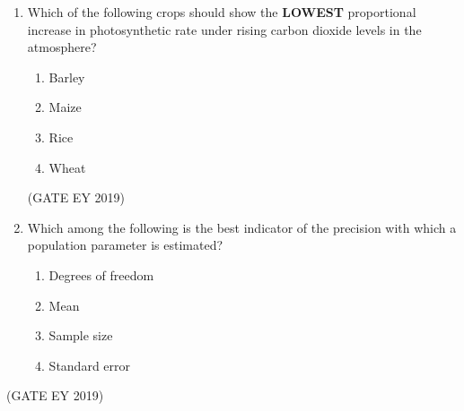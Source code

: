 \documentclass[journal,12pt,onecolumn]{IEEEtran}
\theoremstyle{remark}
\begin{document}
\begin{enumerate}[resume]
\begin{multicols}{2}
\begin{enumerate}
\item P = i; Q = iii; R = iv; S = ii  
\item P = iii; Q = i; R = iv; S = ii  
\item P = ii; Q = i; R = iii; S = iv  
\item P = i; Q = iv; R = ii; S = iii  
\end{enumerate}
\end{multicols}
\hfill{(GATE EY 2019)}
\item Which of the following crops should show the \textbf{LOWEST} proportional increase in photosynthetic rate under rising carbon dioxide levels in the atmosphere?  
\begin{multicols}{2}
\begin{enumerate}
\item Barley  
\item Maize  
\item Rice  
\item Wheat  
\end{enumerate}
\end{multicols}
\hfill{(GATE EY 2019)}
\item Which among the following is the best indicator of the precision with which a population parameter is estimated?  
\begin{multicols}{2}
\begin{enumerate}
\item Degrees of freedom  
\item Mean  
\item Sample size  
\item Standard error  
\end{enumerate}
\end{multicols}

\end{enumerate}
\hfill{(GATE EY 2019)}
\end{document}

